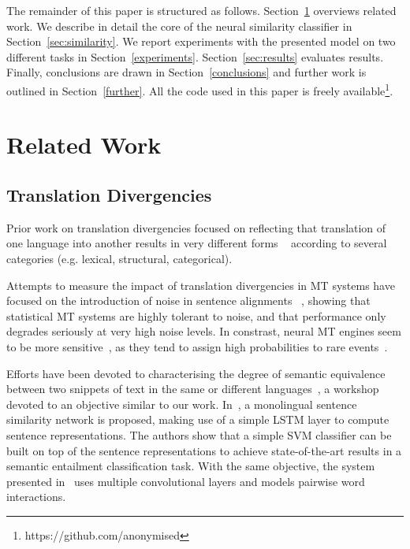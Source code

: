\documentclass[11pt,a4paper]{article}
\begin{document}

The remainder of this paper is structured as follows. 
Section~\ref{related} overviews related work. 
We describe in detail the core of the neural similarity classifier in Section~\ref{sec:similarity}. 
We report experiments with the presented model on two different tasks in Section~\ref{experiments}.
Section~\ref{sec:results} evaluates results. 
Finally, conclusions are drawn in Section~\ref{conclusions} and further work is outlined in Section~\ref{further}.
All the code used in this paper is freely available\footnote{https://github.com/anonymised}.

\section{Related Work}
\label{related}

\subsection{Translation Divergencies}

Prior work on translation divergencies focused on reflecting that translation of one language into another results in very different forms ~\cite{J94-4004} according to several categories (e.g. lexical, structural, categorical). 

Attempts to measure the impact of translation divergencies in MT systems have focused on the introduction of noise in sentence alignments ~\cite{goute2012}, showing that statistical MT systems are highly tolerant to noise, and that performance only degrades seriously at very high noise levels. In constrast, neural MT engines seem to be more sensitive~\cite{chen2016adaptation}, as they tend to assign high probabilities to rare events~\cite{Hassan2018AchievingHP}.

Efforts have been devoted to characterising the degree of semantic equivalence between two snippets of text in the same or different languages~\cite{conf/semeval/AgirreBCDGMRW16}, a workshop devoted to an objective similar to our work. In~\cite{Mueller:2016:SRA:3016100.3016291}, a monolingual sentence similarity network is proposed, making use of a simple LSTM layer to compute sentence representations. The authors show that a simple SVM classifier can be built on top of the sentence representations to achieve state-of-the-art results in a semantic entailment classification task. With the same objective, the system presented in~\cite{N16-1108} uses multiple convolutional layers and models pairwise word interactions. %
\end{document}
